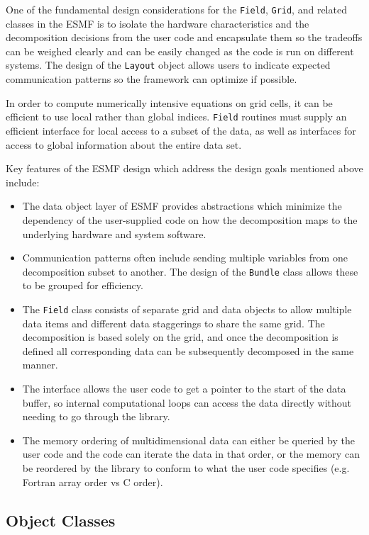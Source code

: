 One of the fundamental design considerations for the {\tt Field},
{\tt Grid}, and related classes in the ESMF is to isolate 
the hardware characteristics and the decomposition decisions from the
user code and encapsulate them so the tradeoffs can be 
weighed clearly and can be easily changed as the code is 
run on different systems.  The design of the {\tt Layout} object
allows users to indicate expected communication patterns so 
the framework can optimize if possible.

In order to compute numerically intensive equations on grid
cells, it can be efficient to use local rather 
than global indices.  {\tt Field} routines
must supply an efficient interface for local access to a
subset of the data, as well as interfaces for access to
global information about the entire data set.

Key features of the ESMF design which address the design goals
mentioned above include:
\begin{itemize}
\item The data object layer of ESMF provides abstractions which
minimize the dependency of the user-supplied code on 
how the decomposition maps to the underlying hardware
and system software.
\item Communication patterns often include sending multiple
variables from one decomposition subset to another.  
The design of the {\tt Bundle} class
allows these to be grouped for efficiency.
\item The {\tt Field} class consists of separate grid and data 
objects to allow multiple data items and different data staggerings
to share the same grid.  The decomposition is based solely on
the grid, and once the decomposition is defined all corresponding
data can be subsequently decomposed in the same manner.
\item The interface allows the user code to get a pointer to the
start of the data buffer, so internal computational loops can access
the data directly without needing to go through the library.
\item The memory ordering of multidimensional data can either be
queried by the user code and the code can iterate the data in that
order, or the memory can be reordered by the library to conform to what
the user code specifies (e.g. Fortran array order vs C order).

\end{itemize}

\subsection{Object Classes}

